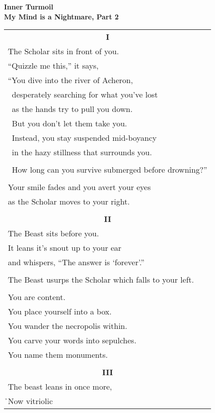 \documentclass{article}
\begin{document}
\begin{center}
\textbf{Inner Turmoil} \\
{\small\textbf{My Mind is a Nightmare, Part 2}} \\
\vspace*{2ex}
\begin{tabular}{l}
\multicolumn{1}{c}{\textbf{I}} \\
The Scholar sits in front of you. \\
``Quizzle me this,'' it says, \\ %
``You dive into the river of Acheron, \\
\ desperately searching for what you've lost \\
\ as the hands try to pull you down. \\
\ But you don't let them take you. \\
\ Instead, you stay suspended mid-boyancy \\
\ in the hazy stillness that surrounds you. \\
\\
\ How long can you survive submerged before drowning?'' \\
\\
Your smile fades and you avert your eyes \\
as the Scholar moves to your right. \\
\\
\multicolumn{1}{c}{\textbf{II}} \\
The Beast sits before you. \\
It leans it's snout up to your ear \\
and whispers, ``The answer is `forever'.'' \\
\\
The Beast usurps the Scholar which falls to your left. \\
\\
You are content. \\
You place yourself into a box. \\
You wander the necropolis within. \\
You carve your words into sepulches. \\
You name them monuments. \\
\\
\multicolumn{1}{c}{\textbf{III}} \\
The beast leans in once more, \\
\h{}Now vitriolic \\ %

\end{tabular}
\end{center}
\end{document}
